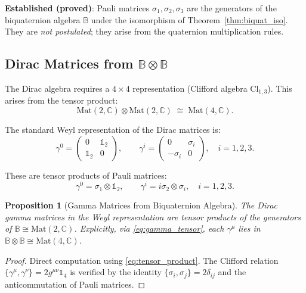 \documentclass[12pt]{article}
\newtheorem{proposition}[theorem]{Proposition}
\theoremstyle{definition}
\theoremstyle{remark}
\begin{document}
\begin{resultbox}
\textbf{Established (proved)}: Pauli matrices $\sigma_1,\sigma_2,\sigma_3$ are the generators
of the biquaternion algebra $\mathbb{B}$ under the isomorphism of Theorem~\ref{thm:biquat_iso}.
They are \emph{not postulated}; they arise from the quaternion multiplication rules.
\end{resultbox}

\subsection{Dirac Matrices from $\mathbb{B}\otimes\mathbb{B}$}

The Dirac algebra requires a $4\times 4$ representation (Clifford algebra $\mathrm{Cl}_{1,3}$).
This arises from the tensor product:
\begin{equation}
  \mathrm{Mat}(2,\mathbb{C})\otimes\mathrm{Mat}(2,\mathbb{C}) \;\cong\; \mathrm{Mat}(4,\mathbb{C}).
  \label{eq:tensor_product}
\end{equation}

The standard Weyl representation of the Dirac matrices is:
\begin{equation}
  \gamma^0 = \begin{pmatrix}0 & \mathbb{1}_2\\\mathbb{1}_2 & 0\end{pmatrix},\qquad
  \gamma^i = \begin{pmatrix}0 & \sigma_i\\-\sigma_i & 0\end{pmatrix},\quad i=1,2,3.
  \label{eq:weyl_gamma}
\end{equation}

These are tensor products of Pauli matrices:
\begin{equation}
  \gamma^0 = \sigma_1\otimes\mathbb{1}_2,\qquad
  \gamma^i = i\sigma_2\otimes\sigma_i,\quad i=1,2,3.
  \label{eq:gamma_tensor}
\end{equation}

\begin{proposition}[Gamma Matrices from Biquaternion Algebra]
The Dirac gamma matrices in the Weyl representation are tensor products of the generators
of $\mathbb{B}\cong\mathrm{Mat}(2,\mathbb{C})$.  Explicitly, via \eqref{eq:gamma_tensor},
each $\gamma^\mu$ lies in $\mathbb{B}\otimes\mathbb{B}\cong\mathrm{Mat}(4,\mathbb{C})$.
\end{proposition}

\begin{proof}
Direct computation using \eqref{eq:tensor_product}.  The Clifford relation
$\{\gamma^\mu,\gamma^\nu\}=2g^{\mu\nu}\mathbb{1}_4$ is verified by the identity
$\{\sigma_i,\sigma_j\}=2\delta_{ij}$ and the anticommutation of Pauli matrices.
\end{proof}
\end{document}
